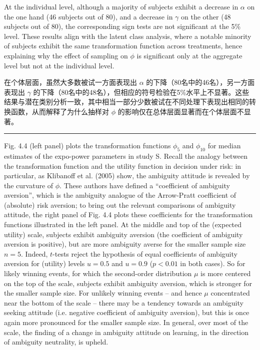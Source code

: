 \documentclass[12pt,a4paper]{article}
\newenvironment{original}
  {\par\vspace{0.5em}\noindent\color{black}\ignorespaces}
  {\par\vspace{0.3em}}
\newenvironment{translation}
  {\par\noindent\color{transblue}\ignorespaces}
  {\par\vspace{0.8em}\hrule\vspace{0.5em}}
\begin{document}
\begin{original}
At the individual level, although a majority of subjects exhibit a decrease in $\alpha$ on the one hand (46 subjects out of 80), and a decrease in $\gamma$ on the other (48 subjects out of 80), the corresponding sign tests are not significant at the 5\% level. These results align with the latent class analysis, where a notable minority of subjects exhibit the same transformation function across treatments, hence explaining why the effect of sampling on $\phi$ is significant only at the aggregate level but not at the individual level.
\end{original}

\begin{translation}
在个体层面，虽然大多数被试一方面表现出 $\alpha$ 的下降（80名中的46名），另一方面表现出 $\gamma$ 的下降（80名中的48名），但相应的符号检验在5\%水平上不显著。这些结果与潜在类别分析一致，其中相当一部分少数被试在不同处理下表现出相同的转换函数，从而解释了为什么抽样对 $\phi$ 的影响仅在总体层面显著而在个体层面不显著。
\end{translation}

\begin{original}
Fig. 4.4 (left panel) plots the transformation functions $\phi_5$ and $\phi_{10}$ for median estimates of the expo-power parameters in study S. Recall the analogy between the transformation function and the utility function in decision under risk: in particular, as Klibanoff et al. (2005) show, the ambiguity attitude is revealed by the curvature of $\phi$. These authors have defined a ``coefficient of ambiguity aversion'', which is the ambiguity analogue of the Arrow-Pratt coefficient of (absolute) risk aversion; to bring out the relevant comparisons of ambiguity attitude, the right panel of Fig. 4.4 plots these coefficients for the transformation functions illustrated in the left panel. At the middle and top of the (expected utility) scale, subjects exhibit ambiguity aversion (the coefficient of ambiguity aversion is positive), but are more ambiguity averse for the smaller sample size $n = 5$. Indeed, $t$-tests reject the hypothesis of equal coefficients of ambiguity aversion for (utility) levels $u = 0.5$ and $u = 0.9$ ($p < 0.01$ in both cases). So for likely winning events, for which the second-order distribution $\mu$ is more centered on the top of the scale, subjects exhibit ambiguity aversion, which is stronger for the smaller sample size. For unlikely winning events -- and hence $\mu$ concentrated near the bottom of the scale -- there may be a tendency towards an ambiguity seeking attitude (i.e. negative coefficient of ambiguity aversion), but this is once again more pronounced for the smaller sample size. In general, over most of the scale, the finding of a change in ambiguity attitude on learning, in the direction of ambiguity neutrality, is upheld.
\end{original}
\end{document}
